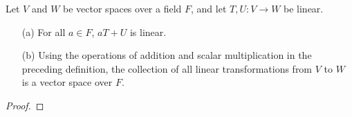 \begin{theorem}
   Let \( V  \) and \( W  \) be vector spaces over a field \( F  \), and let \( T,U: V \to W  \) be linear. 
   \begin{enumerate}
       \item[(a)] For all \( a \in F  \), \( aT + U  \) is linear.
       \item[(b)] Using the operations of addition and scalar multiplication in the preceding definition, the collection of all linear transformations from \( V  \) to \( W  \) is a vector space over \( F  \).
   \end{enumerate}
\end{theorem}
\begin{proof}

\end{proof}
